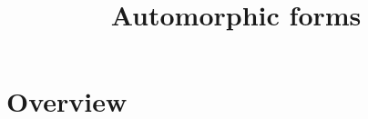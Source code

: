 

%


\title{Automorphic forms}


\maketitle

\label{section-phantom}

\tableofcontents


\section{Overview}
\label{section-overview}










